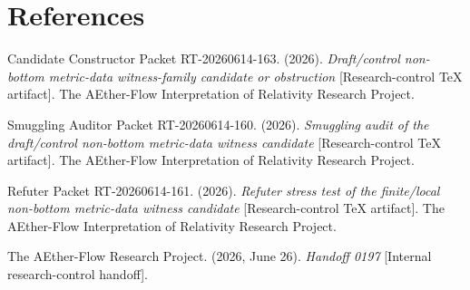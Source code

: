\documentclass[11pt]{article}
\begin{document}
\section{References}

Candidate Constructor Packet RT-20260614-163. (2026). \emph{Draft/control
non-bottom metric-data witness-family candidate or obstruction}
[Research-control TeX artifact]. The AEther-Flow Interpretation of
Relativity Research Project.

Smuggling Auditor Packet RT-20260614-160. (2026). \emph{Smuggling audit of
the draft/control non-bottom metric-data witness candidate}
[Research-control TeX artifact]. The AEther-Flow Interpretation of
Relativity Research Project.

Refuter Packet RT-20260614-161. (2026). \emph{Refuter stress test of the
finite/local non-bottom metric-data witness candidate} [Research-control TeX
artifact]. The AEther-Flow Interpretation of Relativity Research Project.

The AEther-Flow Research Project. (2026, June 26). \emph{Handoff 0197}
[Internal research-control handoff].
\end{document}
